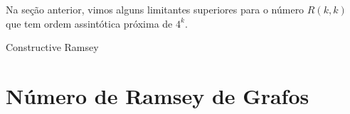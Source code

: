 Na seção anterior, vimos alguns limitantes superiores para o número $R(k,k)$ que tem ordem assintótica próxima de $4^k$.

\begin{openproblem}
Constructive Ramsey
\end{openproblem}


\section{Número de Ramsey de Grafos}

